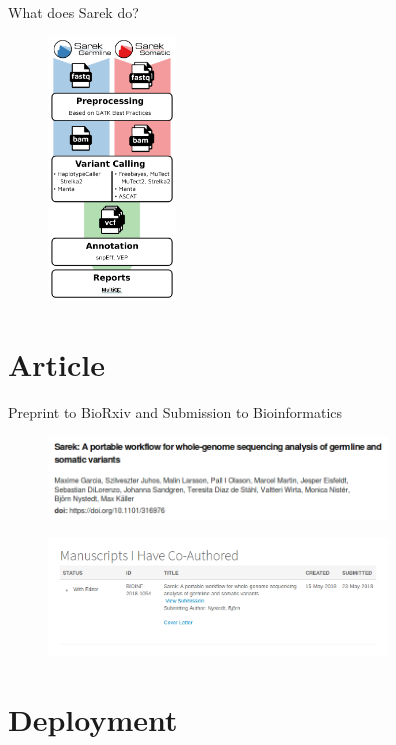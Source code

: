 \documentclass{beamer}
\begin{document}
\begin{frame}{What does Sarek do?}
	\begin{figure}[t]
		\includegraphics[height=7cm]{pictures/Sarek_workflow_2}
	\end{figure}
\end{frame}

\section{Article}

\begin{frame}{Preprint to BioRxiv and Submission to Bioinformatics}
	\begin{figure}
		\includegraphics[width=9cm]{pictures/Preprint-Biorxiv.png}
	\end{figure}
	\begin{figure}
		\includegraphics[width=9cm]{pictures/Manuscript-with-editor.png}
	\end{figure}
\end{frame}

\section{Deployment}
\end{document}
